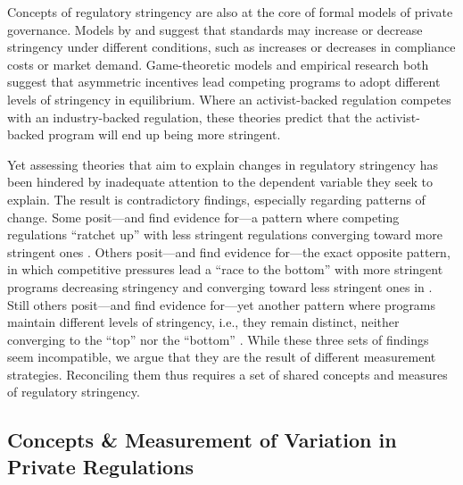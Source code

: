 \documentclass[
      12pt,
            Review ]{article}
\begin{document}
Concepts of regulatory stringency are also at the core of formal models of private governance. Models by \citet{Abderrazak2009} and \citet{Fischer2014} suggest that standards may increase or decrease stringency under different conditions, such as increases or decreases in compliance costs or market demand. Game-theoretic models \citep{Fischer2014, Li2015, Poret2016} and empirical research \citep{Cashore2004} both suggest that asymmetric incentives lead competing programs to adopt different levels of stringency in equilibrium. Where an activist-backed regulation competes with an industry-backed regulation, these theories predict that the activist-backed program will end up being more stringent.

Yet assessing theories that aim to explain changes in regulatory stringency has been hindered by inadequate attention to the dependent variable they seek to explain. The result is contradictory findings, especially regarding patterns of change. Some posit---and find evidence for---a pattern where competing regulations ``ratchet up'' with less stringent regulations converging toward more stringent ones \citep{Overdevest2005, Overdevest2010, Overdevest2014}. Others posit---and find evidence for---the exact opposite pattern, in which competitive pressures lead a ``race to the bottom'' with more stringent programs decreasing stringency and converging toward less stringent ones in \citep{Abbott2010, Fransen2011, Gulbrandsen2004}. Still others posit---and find evidence for---yet another pattern where programs maintain different levels of stringency, i.e., they remain distinct, neither converging to the ``top'' nor the ``bottom'' \citep{Fischer2014, Li2015, Poret2016, Cashore2004}. While these three sets of findings seem incompatible, we argue that they are the result of different measurement strategies. Reconciling them thus requires a set of shared concepts and measures of regulatory stringency.

\hypertarget{concepts-measurement-of-variation-in-private-regulations}{%
\subsection{Concepts \& Measurement of Variation in Private Regulations}\label{concepts-measurement-of-variation-in-private-regulations}}
\end{document}
